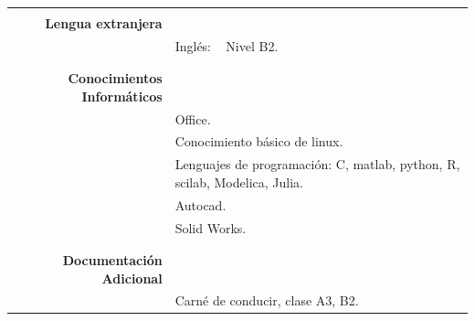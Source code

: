 \documentclass[a4paper,10pt, sans]{article}
\begin{document}
\begin{table}[ht!]
\begin{tabularx}{\textwidth}{r X}  
 \hline \\
    \textbf{Lengua extranjera} & {} \\ [1ex]
      {} & Inglés: ~ Nivel B2. \\ \\
 \hline \\
    \textbf{Conocimientos Informáticos} & {} \\ [1ex]
      {} & Office. \\
      {} & Conocimiento básico de linux. \\
      {} & Lenguajes de programación: C, matlab, python, R, scilab, Modelica, Julia. \\ 
      {} & Autocad. \\
      {} & Solid Works. \\ \\
 \hline \\
    \textbf{Documentación Adicional} & {} \\ [1ex]
      {} & Carné de conducir, clase A3, B2.
  \end{tabularx}
\end{table}
\end{document}
